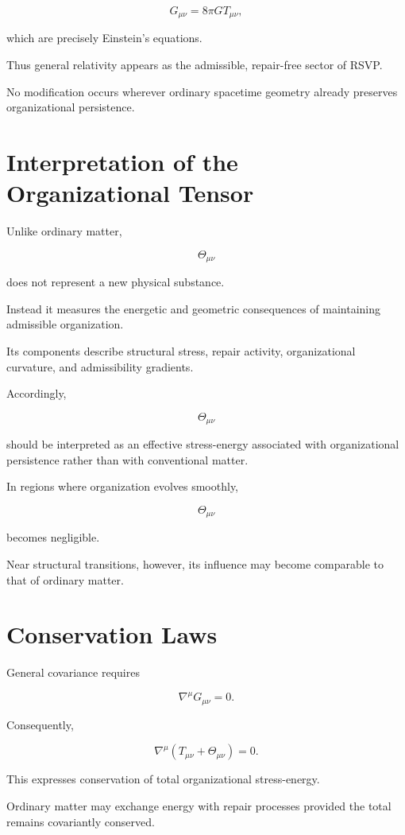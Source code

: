 \documentclass[11pt,oneside]{book}
\numberwithin{equation}{chapter}
\theoremstyle{definition}
\theoremstyle{plain}
\begin{document}
\[
\boxed{
G_{\mu\nu}
=
8\pi G
T_{\mu\nu},
}
\]

which are precisely Einstein's equations.

Thus general relativity appears as the admissible, repair-free sector of
RSVP.

No modification occurs wherever ordinary spacetime geometry already
preserves organizational persistence.

\section{Interpretation of the Organizational Tensor}

Unlike ordinary matter,

\[
\Theta_{\mu\nu}
\]

does not represent a new physical substance.

Instead it measures the energetic and geometric consequences of maintaining
admissible organization.

Its components describe structural stress, repair activity, organizational
curvature, and admissibility gradients.

Accordingly,

\[
\Theta_{\mu\nu}
\]

should be interpreted as an effective stress-energy associated with
organizational persistence rather than with conventional matter.

In regions where organization evolves smoothly,

\[
\Theta_{\mu\nu}
\]

becomes negligible.

Near structural transitions, however, its influence may become comparable to
that of ordinary matter.

\section{Conservation Laws}

General covariance requires

\[
\nabla^\mu
G_{\mu\nu}
=
0.
\]

Consequently,

\[
\nabla^\mu
\left(
T_{\mu\nu}
+
\Theta_{\mu\nu}
\right)
=
0.
\]

This expresses conservation of total organizational stress-energy.

Ordinary matter may exchange energy with repair processes provided the total
remains covariantly conserved.
\end{document}
